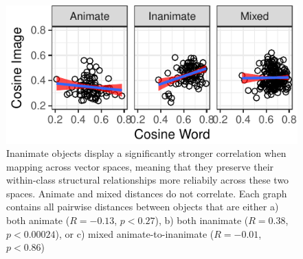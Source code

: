 \documentclass[10pt, letterpaper]{article}
\newenvironment{CodeChunk}{}{}
\begin{document}
\begin{CodeChunk}
\begin{figure}[tb]
\includegraphics{figs/pairwise-corr-animate-vs-not-1} \caption[Inanimate objects display a significantly stronger correlation when mapping across vector spaces, meaning that they preserve their within-class structural relationships more reliabily across these two spaces]{Inanimate objects display a significantly stronger correlation when mapping across vector spaces, meaning that they preserve their within-class structural relationships more reliabily across these two spaces. Animate and mixed distances do not correlate. Each graph contains all pairwise distances between objects that are either a) both animate ($R = -0.13$, $p < 0.27$), b) both inanimate ($R = 0.38$, $p < 0.00024$), or c) mixed animate-to-inanimate ($R = -0.01$, $p < 0.86$)}\label{fig:pairwise-corr-animate-vs-not}
\end{figure}
\end{CodeChunk}
\end{document}
